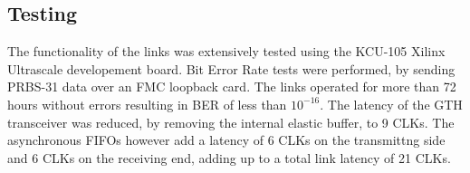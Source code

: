 \documentclass[a4paper]{PoS}
\begin{document}
\subsection{Testing}
The functionality of the links was extensively tested using the KCU-105 Xilinx Ultrascale developement board. Bit Error Rate tests were performed, by sending PRBS-31 data over an FMC loopback card. The links operated for more than 72 hours without errors resulting in BER of less than $10^{-16}$. The latency of the GTH transceiver was reduced, by removing the internal elastic buffer, to 9 CLKs. The asynchronous FIFOs however add a latency of 6 CLKs on the transmittng side and 6 CLKs on the receiving end, adding up to a total link latency of 21 CLKs.

 


\end{document}
